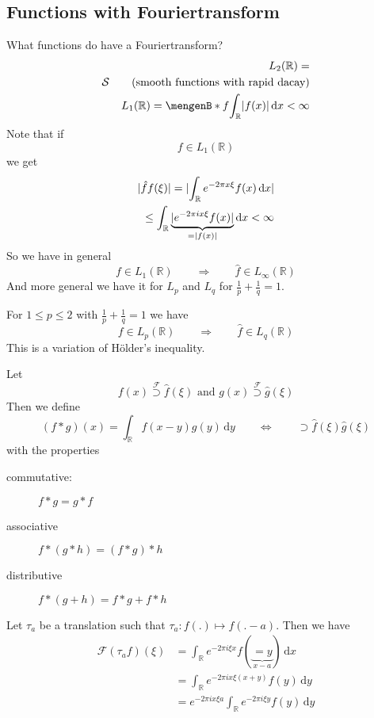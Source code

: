 \subsection{Functions with Fouriertransform} 
\label{sub:functions_with_fouriertransform}
What functions do have a Fouriertransform?
\begin{align*}
	L_2(\mathbb{R}) = \\
	\mathcal{S} \qquad \text{(smooth functions with rapid dacay)} \\
	L_1(\mathbb{R}) = \set[f]{\int_{\mathbb{R}}^{}\abs{f(x)} \,\mathrm{d}x < \infty}
\end{align*}
Note that if
\[
	f \in L_1(\mathbb{R}) 
\]
we get
\begin{align*}
	\lvert\hat{f}f(\xi)\rvert = \lvert\int_{\mathbb{R}}^{} e^{-2 \pi x \xi} f(x) \,\mathrm{d}x\rvert \\
	\leq \int_{\mathbb{R}}^{} \underset{= \lvert f(x)\rvert}{\underbrace{\lvert e^{-2 \pi i x \xi}f(x)\rvert}} \,\mathrm{d}x < \infty
\end{align*}
So we have in general
\[
	f \in L_1(\mathbb{R}) \qquad \Rightarrow \qquad \hat{f} \in L_{\infty}(\mathbb{R})
\]
And more general we have it for $L_p$ and $L_q$ for $\frac{1}{p}+ \frac{1}{q} =1$.
\begin{theorem}
	For $1 \leq p \leq 2$ with $\frac{1}{p} + \frac{1}{q} = 1$ we have
	\[
		f \in L_p(\mathbb{R}) \qquad \Rightarrow \qquad \hat{f} \in L_q(\mathbb{R})
	\]
	This is a variation of Hölder's inequality.
\end{theorem}
\begin{theorem}
	Let \[
		f(x) \stackrel{\mathcal{F}}{\supset} \hat{f}(\xi) \text{ and } g(x) \stackrel{\mathcal{F}}{\supset} \hat{g}(\xi)
	\]
	Then we define
	\[
		(f * g)(x) = \int_{\mathbb{R}}^{} f(x-y)g(y) \,\mathrm{d}y \qquad \Leftrightarrow \qquad \supset \hat{f}(\xi)\hat{g}(\xi)
	\]
	with the properties
	\begin{description}
		\item[commutative:] $f * g= g * f$
		\item[associative] $f *( g * h) = (f*g) * h$
		\item[distributive] $f * (g + h) = f *g + f *h$ 
	\end{description}
\end{theorem}
Let $\tau_a$ be a translation such that $\tau_a: f(.) \mapsto f(. -a)$. Then we have
\begin{align*}
	\mathcal{F}(\tau_a f)(\xi) &= \int_{\mathbb{R}}^{}e ^{-2 \pi i \xi x}f(\underset{x-a}{\underbrace{=y}}) \,\mathrm{d}x \\
	&= \int_{\mathbb{R}}^{} e^{-2 \pi i x \xi(x+y)} f(y) \,\mathrm{d}y \\
	&= e^{-2 \pi i x \xi a} \int_{\mathbb{R}}^{} e^{-2 \pi i \xi y} f(y) \,\mathrm{d}y 
\end{align*}
